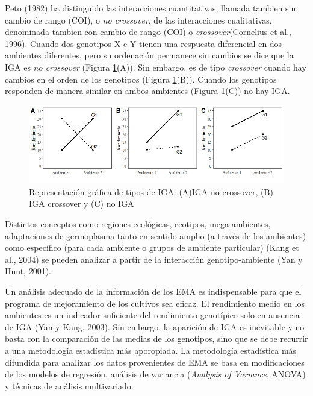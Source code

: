 Peto (1982) ha distinguido las interacciones cuantitativas, llamada tambien sin cambio de rango (COI), o \emph{no crossover}, de las interacciones cualitativas, denominada tambien con
cambio de rango (COI) o \emph{crossover}(Cornelius et al., 1996). Cuando dos genotipos X e Y tienen una respuesta diferencial en dos ambientes diferentes, pero su ordenación permanece sin cambios se dice que la IGA es \emph{no crossover} (Figura \ref{fig:fig11}(A)). Sin embargo, es de tipo \emph{crossover} cuando hay cambios en el orden de los genotipos (Figura  \ref{fig:fig11}(B)). Cuando los genotipos responden de manera similar en ambos ambientes (Figura \ref{fig:fig11}(C)) no hay IGA. 


\begin{figure}[h]
\begin{center}
\includegraphics[width=14cm]{./Graficos/interac}
\end{center}
\caption{Representación gráfica de tipos de IGA: (A)IGA no crossover, (B) IGA crossover y (C) no IGA}
\label{fig:fig11}
\end{figure}


Distintos conceptos como regiones ecológicas, ecotipos, mega-ambientes, adaptaciones de germoplasma tanto en sentido amplio (a través de los ambientes) como específico (para cada ambiente o grupos de ambiente particular) (Kang et al., 2004) se pueden analizar a partir de la interacción genotipo-ambiente (Yan y Hunt, 2001).


Un análisis adecuado de la información de los EMA es indispensable para que el programa de mejoramiento de los cultivos sea eficaz. El rendimiento medio en los ambientes es un indicador suficiente del rendimiento genotípico solo en ausencia de IGA (Yan y Kang, 2003). Sin embargo, la aparición de IGA es inevitable y no basta con la comparación de las medias de los genotipos, sino que se debe recurrir a una metodología estadística más aporopiada. La metodología estadística más difundida para analizar los datos provenientes de EMA se basa en modificaciones de los modelos de regresión, análisis de variancia (\emph{Analysis of Variance}, ANOVA) y técnicas de análisis multivariado. 


